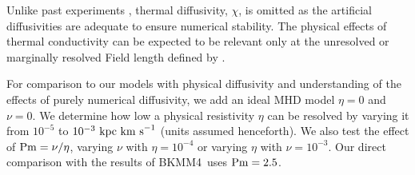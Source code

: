 \documentclass[preprint2]{aastex63}
\newcommand\Pm{{\rm Pm} }
\newcommand\kpc{~ {\rm kpc}}
\newcommand\dx{ {\delta x}}
\newcommand\kms{~ {\rm km~ s}^{-1}}
\newcommand\BKM{{\sf BKMM4}}
\newcommand{\fg}[1]{\textcolor{midgreen}{#1}}
\newcommand{\mm}[1]{\textcolor{mypurple}{#1}}
\newcommand{\fag}[1]{\textcolor{midblue}{FAG: #1}}
\begin{document}
 \fg{Unlike past} experiments \citep{Gent:2013a,Gent:2013b,GMKSH20},
 thermal diffusivity, $\chi$, \fg{is omitted as} the artificial diffusivities
 are adequate to ensure numerical stability.
 \fg{The} physical effects of thermal
 conductivity can be expected to be relevant only at the unresolved or
 marginally resolved Field length defined by \citet[][named after George
 Field, not the magnetic field]{BM90}.

 \mm{For comparison to our models with physical diffusivity and
   understanding of the effects of purely numerical diffusivity, we
   add an ideal MHD model}
 $\eta=0$ \fg{and $\nu=0$.}
 We determine how low a physical resistivity $\eta$ can be resolved by varying
 it from $10^{-5}$ to $10^{-3}\kpc\kms$ (units assumed henceforth).
 \fg{We also test the effect of $\Pm=\nu/\eta$, varying $\nu$ with 
 $\eta=10^{-4}$ or varying $\eta$ with $\nu=10^{-3}$.}
 Our direct comparison with the results of \fg{\BKM\ }uses $\Pm=2.5$.
 

\end{document}
